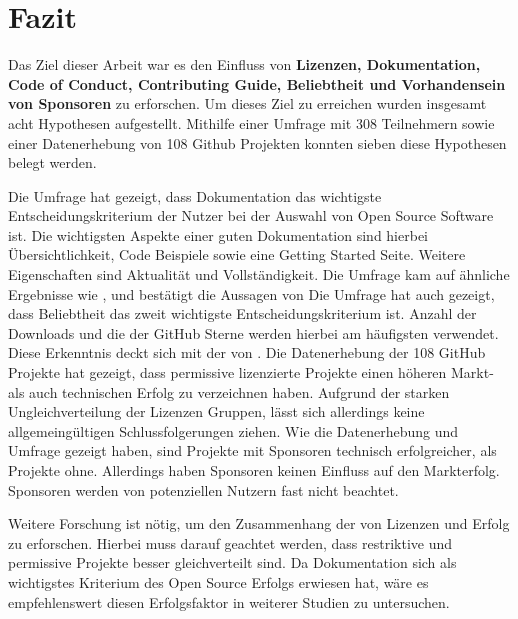 \chapter{Fazit}


Das Ziel dieser Arbeit war es den Einfluss von \textbf{Lizenzen, Dokumentation, Code of Conduct,
    Contributing Guide, Beliebtheit und Vorhandensein von Sponsoren} zu erforschen. Um dieses Ziel zu
erreichen wurden insgesamt acht Hypothesen aufgestellt. Mithilfe einer Umfrage mit 308 Teilnehmern
sowie einer Datenerhebung von 108 Github Projekten konnten sieben diese Hypothesen belegt werden.

Die Umfrage hat gezeigt, dass Dokumentation das wichtigste Entscheidungskriterium der Nutzer bei
der Auswahl von Open Source Software ist. Die wichtigsten Aspekte einer guten Dokumentation sind
hierbei Übersichtlichkeit, Code Beispiele sowie eine Getting Started Seite. Weitere Eigenschaften
sind Aktualität und Vollständigkeit. Die Umfrage kam auf ähnliche Ergebnisse wie \cite{GitHubOpenSourceSurvey2017},
und bestätigt die Aussagen von \cite{scottEightRulesGood2018}
Die Umfrage hat auch gezeigt, dass Beliebtheit das zweit wichtigste Entscheidungskriterium ist.
Anzahl der Downloads und die der GitHub Sterne werden hierbei am häufigsten verwendet. Diese Erkenntnis
deckt sich mit der von \cite{midhaFactorsAffectingSuccess2012}.
Die Datenerhebung der 108 GitHub Projekte hat gezeigt, dass permissive lizenzierte Projekte einen
höheren Markt- als auch technischen Erfolg zu verzeichnen haben.
Aufgrund der starken Ungleichverteilung der Lizenzen Gruppen, lässt sich allerdings keine allgemeingültigen
Schlussfolgerungen ziehen. 
Wie die Datenerhebung und Umfrage gezeigt haben, sind Projekte mit Sponsoren technisch erfolgreicher, als
Projekte ohne. Allerdings haben Sponsoren keinen Einfluss auf den Markterfolg. Sponsoren werden von 
potenziellen Nutzern fast nicht beachtet.

Weitere Forschung ist nötig, um den Zusammenhang der von Lizenzen und Erfolg zu erforschen. Hierbei
muss darauf geachtet werden, dass restriktive und permissive Projekte besser gleichverteilt sind.
Da Dokumentation sich als wichtigstes Kriterium des Open Source Erfolgs erwiesen hat, wäre es empfehlenswert
diesen Erfolgsfaktor in weiterer Studien zu untersuchen.